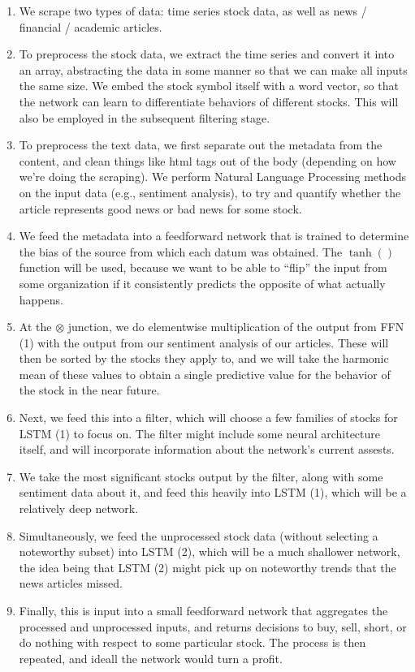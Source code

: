 \documentclass[final]{article}
\begin{document}
\begin{enumerate}
  \item We scrape two types of data: time series stock data, as well
    as news / financial / academic articles.
  \item To preprocess the stock data, we extract the time series and
    convert it into an array, abstracting the data in some manner so
    that we can make all inputs the same size. We embed the stock
    symbol itself with a word vector, so that the network can learn to
    differentiate behaviors of different stocks. This will also be
    employed in the subsequent filtering stage.
  \item To preprocess the text data, we first separate out the
    metadata from the content, and clean things like html tags out of
    the body (depending on how we're doing the scraping). We perform
    Natural Language Processing methods on the input data (e.g.,
    sentiment analysis), to try and quantify whether the article
    represents good news or bad news for some stock.
  \item We feed the metadata into a feedforward network that is
    trained to determine the bias of the source from which each datum
    was obtained. The $\tanh()$ function will be used, because we
    want to be able to ``flip'' the input from some organization if
    it consistently predicts the opposite of what actually happens.
  \item At the $\otimes$ junction, we do elementwise multiplication of
    the output from FFN (1) with the output from our sentiment
    analysis of our articles. These will then be sorted by the stocks
    they apply to, and we will take the harmonic mean of these values
    to obtain a single predictive value for the behavior of the stock
    in the near future.
  \item Next, we feed this into a filter, which will choose a few
    families of stocks for LSTM (1) to focus on. The filter might
    include some neural architecture itself, and will incorporate
    information about the network's current assests.
  \item We take the most significant stocks output by the filter,
    along with some sentiment data about it, and feed this heavily
    into LSTM (1), which will be a relatively deep network.
  \item Simultaneously, we feed the unprocessed stock data (without
    selecting a noteworthy subset) into LSTM (2), which will be a much
    shallower network, the idea being that LSTM (2) might pick up on
    noteworthy trends that the news articles missed.
  \item Finally, this is input into a small feedforward network that
    aggregates the processed and unprocessed inputs, and returns
    decisions to buy, sell, short, or do nothing with respect to some
    particular stock. The process is then repeated, and ideall the
    network would turn a profit.
\end{enumerate}
\end{document}
